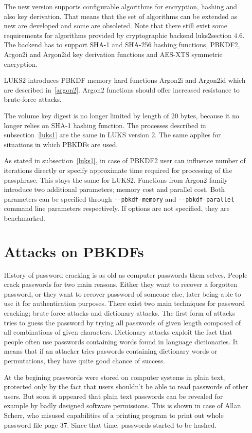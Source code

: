 \documentclass[nolof]{fithesis3}
\begin{document}
The new version supports configurable algorithms for encryption, hashing and also key derivation. That means that the set of algorithms can be extended as new are developed and some are obsoleted. Note that there still exist some requirements for algorithms provided by cryptographic backend \parencite{}{luks2}{section 4.6}. The backend has to support SHA-1 and SHA-256 hashing functions, PBKDF2, Argon2i and Argon2id key derivation functions and AES-XTS symmetric encryption.

LUKS2 introduces PBKDF memory hard functions Argon2i and Argon2id which are described in~\ref{argon2}. Argon2 functions should offer increased resistance to brute-force attacks.

The volume key digest is no longer limited by length of 20 bytes, because it no longer relies on SHA-1 hashing function. The processes described in subsection~\ref{luks1} are the same in LUKS version 2. The same applies for situations in which PBKDFs are used. 

As stated in subsection~\ref{luks1},  in case of PBKDF2 user can influence number of iterations directly or specify approximate time required for processing of the passphrase. This stays the same for LUKS2. Functions from Argon2 family introduce two additional parameters; memory cost and parallel cost. Both parameters can be specified through \verb+--pbkdf-memory+ and \verb+--pbkdf-parallel+ command line parameters respectively. If options are not specified, they are benchmarked.

\section{Attacks on PBKDFs}
\label{sec:attacks}
History of password cracking is as old as computer passwords them selves. People crack passwords for two main reasons. Either they want to recover a forgotten password, or they want to recover password of someone else, later being able to use it for authentication purposes. There exist two main techniques for password cracking; brute force attacks and dictionary attacks. The first form of attacks tries to guess the password by trying all passwords of given length composed of all combinations of given characters. Dictionary attacks exploit the fact that people often use passwords containing words found in language dictionaries. It means that if an attacker tries paswords containing dictionary words or permutations, they have quite good chance of success.

At the begining passwords were stored on computer systems in plain text, protected only by the fact that users shouldn't be able to read passwords of other users. But soon it appeared that plain text passwords can be revealed for example by badly designed software permissions. This is shown in case of Allan Scherr, who misused capabilities of a printing program to print out whole password file \parencite{ctss}{}{page 37}. Since that time, passwords started to be hashed.
\end{document}
